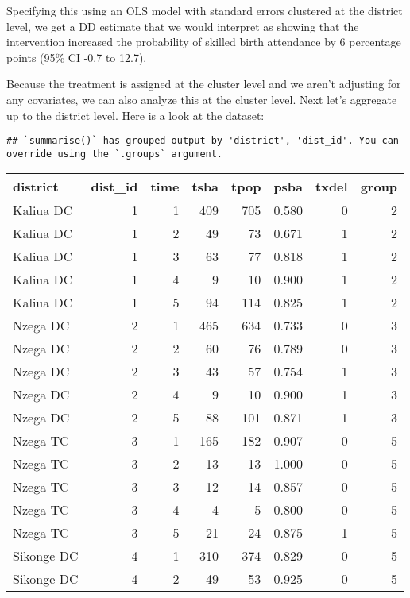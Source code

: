 \documentclass[
]{article}
\begin{document}
Specifying this using an OLS model with standard errors clustered at the
district level, we get a DD estimate that we would interpret as showing
that the intervention increased the probability of skilled birth
attendance by 6 percentage points (95\% CI -0.7 to 12.7).

Because the treatment is assigned at the cluster level and we aren't
adjusting for any covariates, we can also analyze this at the cluster
level. Next let's aggregate up to the district level. Here is a look at
the dataset:

\begin{verbatim}
## `summarise()` has grouped output by 'district', 'dist_id'. You can override using the `.groups` argument.
\end{verbatim}

\begin{table}
\centering
\begin{tabular}[t]{l|r|r|r|r|r|r|r}
\hline
district & dist_id & time & tsba & tpop & psba & txdel & group\\
\hline
Kaliua DC & 1 & 1 & 409 & 705 & 0.580 & 0 & 2\\
\hline
Kaliua DC & 1 & 2 & 49 & 73 & 0.671 & 1 & 2\\
\hline
Kaliua DC & 1 & 3 & 63 & 77 & 0.818 & 1 & 2\\
\hline
Kaliua DC & 1 & 4 & 9 & 10 & 0.900 & 1 & 2\\
\hline
Kaliua DC & 1 & 5 & 94 & 114 & 0.825 & 1 & 2\\
\hline
Nzega DC & 2 & 1 & 465 & 634 & 0.733 & 0 & 3\\
\hline
Nzega DC & 2 & 2 & 60 & 76 & 0.789 & 0 & 3\\
\hline
Nzega DC & 2 & 3 & 43 & 57 & 0.754 & 1 & 3\\
\hline
Nzega DC & 2 & 4 & 9 & 10 & 0.900 & 1 & 3\\
\hline
Nzega DC & 2 & 5 & 88 & 101 & 0.871 & 1 & 3\\
\hline
Nzega TC & 3 & 1 & 165 & 182 & 0.907 & 0 & 5\\
\hline
Nzega TC & 3 & 2 & 13 & 13 & 1.000 & 0 & 5\\
\hline
Nzega TC & 3 & 3 & 12 & 14 & 0.857 & 0 & 5\\
\hline
Nzega TC & 3 & 4 & 4 & 5 & 0.800 & 0 & 5\\
\hline
Nzega TC & 3 & 5 & 21 & 24 & 0.875 & 1 & 5\\
\hline
Sikonge DC & 4 & 1 & 310 & 374 & 0.829 & 0 & 5\\
\hline
Sikonge DC & 4 & 2 & 49 & 53 & 0.925 & 0 & 5\\

\end{tabular}
\end{table}
\end{document}
